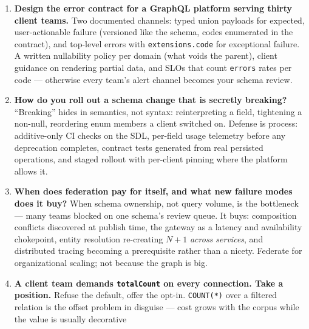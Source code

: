 \begin{enumerate}[label=\textbf{Q\arabic*.}, leftmargin=2.6em]
        low-cardinality field can still fan out expensively in a
        resolver, and \texttt{first: 1} over a full-table scan is ``cheap''
        only on paper. Mitigations: per-field cost weights calibrated to
        measured resolver latency, timeouts per resolver and per
        operation, and query-count telemetry per operation name. Static
        analysis is the sieve; timeouts are the floor.
  \item \textbf{Design the error contract for a GraphQL platform serving
        thirty client teams.}
        Two documented channels: typed union payloads for expected,
        user-actionable failure (versioned like the schema, codes
        enumerated in the contract), and top-level errors with
        \texttt{extensions.code} for exceptional failure. A written
        nullability policy per domain (what voids the parent), client
        guidance on rendering partial data, and SLOs that count
        \texttt{errors} rates per code --- otherwise every team's alert
        channel becomes your schema review.
  \item \textbf{How do you roll out a schema change that is secretly
        breaking?}
        ``Breaking'' hides in semantics, not syntax: reinterpreting a
        field, tightening a non-null, reordering enum members a client
        switched on. Defense is process: additive-only CI checks on the
        SDL, per-field usage telemetry before any deprecation completes,
        contract tests generated from real persisted operations, and
        staged rollout with per-client pinning where the platform allows
        it.
  \item \textbf{When does federation pay for itself, and what new failure
        modes does it buy?}
        When schema ownership, not query volume, is the bottleneck ---
        many teams blocked on one schema's review queue. It buys:
        composition conflicts discovered at publish time, the gateway as
        a latency and availability chokepoint, entity resolution
        re-creating $N{+}1$ \emph{across services}, and distributed
        tracing becoming a prerequisite rather than a nicety. Federate
        for organizational scaling; not because the graph is big.
  \item \textbf{A client team demands \texttt{totalCount} on every
        connection. Take a position.}
        Refuse the default, offer the opt-in. \texttt{COUNT(*)} over a
        filtered relation is the offset problem in disguise --- cost
        grows with the corpus while the value is usually decorative

\end{enumerate}
